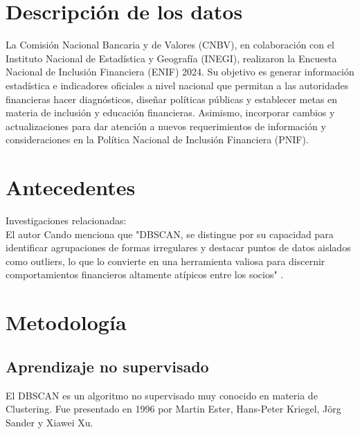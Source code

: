 \documentclass{article}
\begin{document}
\section{Descripción de los datos}

La Comisión Nacional Bancaria y de Valores (CNBV), en colaboración con el Instituto Nacional de Estadística y Geografía (INEGI), realizaron la Encuesta Nacional de Inclusión Financiera (ENIF) 2024. Su objetivo es generar información estadística e indicadores oficiales a nivel nacional que permitan a las autoridades financieras hacer diagnósticos, diseñar políticas públicas y establecer metas en materia de inclusión y educación financieras. Asimismo, incorporar cambios y actualizaciones para dar atención a nuevos requerimientos de información y consideraciones en la Política Nacional de Inclusión Financiera (PNIF).


\section{Antecedentes}

Investigaciones relacionadas:\\

El autor Cando \cite{candofacultad} menciona que "DBSCAN, se distingue por su capacidad para identificar agrupaciones de formas irregulares y destacar puntos de datos aislados como outliers, lo
que lo convierte en una herramienta valiosa para discernir comportamientos financieros
altamente atípicos entre los socios" .

\section{Metodología}

\subsection{Aprendizaje no supervisado}
El DBSCAN es un algoritmo no supervisado muy conocido en materia de Clustering. Fue presentado en 1996 por Martin Ester, Hans-Peter Kriegel, Jörg Sander y Xiawei Xu.\cite{ml_dbscan_ds}\\
\end{document}
